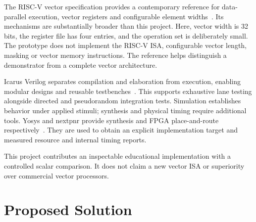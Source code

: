 \documentclass[conference]{IEEEtran}
\begin{document}
The RISC-V vector specification provides a contemporary reference for data-parallel execution, vector registers and configurable element widths~\cite{riscv}. Its mechanisms are substantially broader than this project. Here, vector width is 32 bits, the register file has four entries, and the operation set is deliberately small. The prototype does not implement the RISC-V ISA, configurable vector length, masking or vector memory instructions. The reference helps distinguish a demonstrator from a complete vector architecture.

Icarus Verilog separates compilation and elaboration from execution, enabling modular designs and reusable testbenches~\cite{icarus}. This supports exhaustive lane testing alongside directed and pseudorandom integration tests. Simulation establishes behavior under applied stimuli; synthesis and physical timing require additional tools. Yosys and nextpnr provide synthesis and FPGA place-and-route respectively~\cite{yosys,nextpnr}. They are used to obtain an explicit implementation target and measured resource and internal timing reports.

This project contributes an inspectable educational implementation with a controlled scalar comparison. It does not claim a new vector ISA or superiority over commercial vector processors.

\section{Proposed Solution}
\end{document}
